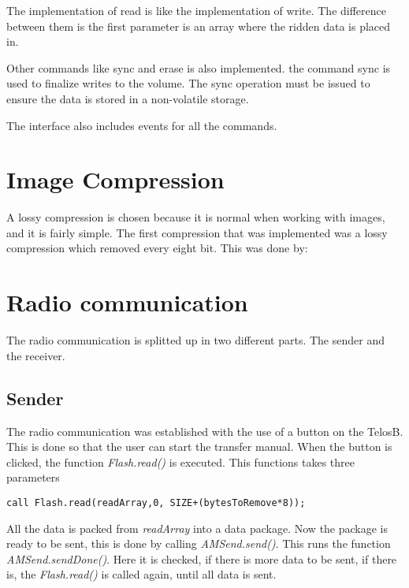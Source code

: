 The implementation of read is like the implementation of write. The difference between them is the first parameter is an array where the ridden data is placed in. 

Other commands like sync and erase is also implemented. the command sync is used to finalize writes to the volume. The sync operation must be issued to ensure the data is stored in a non-volatile storage. 

The interface also includes events for all the commands. 

\section{Image Compression}
A lossy compression is chosen because it is normal when working with images, and it is fairly simple. The first compression that was implemented was a lossy compression which removed every eight bit. This was done by:

\section{Radio communication}
The radio communication is splitted up in two different parts. The sender and the receiver.

\subsection{Sender}
The radio communication was established with the use of a button on the TelosB. This is done so that the 
user can start the transfer manual. When the button is clicked, the function \emph{Flash.read()} is executed. This functions takes three parameters

\begin{lstlisting}[caption={The function Flash.read}, label=lst:fread]
call Flash.read(readArray,0, SIZE+(bytesToRemove*8));
\end{lstlisting}

All the data is packed from \emph{readArray} into a data package. Now the package is ready to be sent, this is done by calling \emph{AMSend.send()}. This runs the function \emph{AMSend.sendDone()}. Here it is checked, if there is more data to be sent, if there is, the \emph{Flash.read()} is called again, until all data is sent. 

